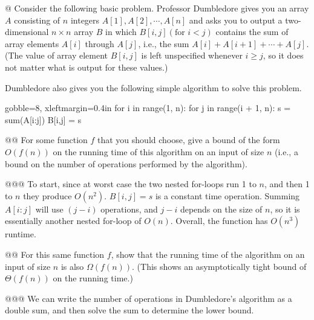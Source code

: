 \documentclass[10pt]{article}
\begin{document}
\begin{easylist}[enumerate]
    @ Consider the following basic problem. Professor Dumbledore gives you an array $A$ consisting of $n$ integers $A[1], A[2], \cdots, A[n]$ and asks you to output a two-dimensional $n \times n$ array $B$ in which $B[i, j] (\text{for } i < j)$ contains the sum of array elements $A[i]$ through $A[j]$, i.e., the sum $A[i] + A[i + 1] + \cdots + A[j]$. (The value of array element $B[i, j]$ is left unspecified whenever $i \ge j$, so it does not matter what is output for these values.)

    Dumbledore also gives you the following simple algorithm to solve this problem.

    \begin{pythoncode*}{gobble=8, xleftmargin=0.4in}
        for i in range(1, n):
            for j in range(i + 1, n):
                s = sum(A[i:j])
                B[i,j] = s
    \end{pythoncode*}

    @@ For some function $f$ that you should choose, give a bound of the form $O(f(n))$ on the running time of this algorithm on an input of size $n$ (i.e., a bound on the number of operations performed by the algorithm).

    @@@ To start, since at worst case the two nested for-loops run 1 to $n$, and then 1 to $n$ they produce $O(n^2)$.  $B[i,j] = s$ is a constant time operation. Summing $A[i:j]$ will use $(j - i)$ operations, and $j-i$ depends on the size of $n$, so it is essentially another nested for-loop of $O(n)$.  Overall, the function has $O(n^3)$ runtime.

    @@ For this same function $f$, show that the running time of the algorithm on an input of size $n$ is also $\Omega(f(n))$. (This shows an asymptotically tight bound of $\Theta(f(n))$ on the running time.)

    @@@ We can write the number of operations in Dumbledore's algorithm as a double sum, and then solve the sum to determine the lower bound.


\end{easylist}
\end{document}
